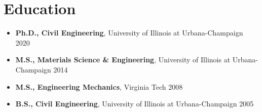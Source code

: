 \documentclass{article}[12pt]
\begin{document}
	
	\vspace{-1em}
	\section*{Education}
	\vspace{-0.5em}
	\begin{itemize}[leftmargin=*]
		\itemsep0em
		\item \textbf{Ph.D., Civil Engineering}, University of Illinois at Urbana-Champaign \hfill{} 2020
		\item \textbf{M.S., Materials Science \& Engineering}, University of Illinois at Urbana-Champaign \hfill{} 2014
		\item \textbf{M.S., Engineering Mechanics}, Virginia Tech \hfill{} 2008
		\item \textbf{B.S., Civil Engineering}, University of Illinois at Urbana-Champaign \hfill{} 2005
	\end{itemize}
	
\end{document}
